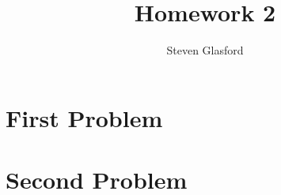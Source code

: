 \documentclass{report}
\title{Homework 2}
\author{Steven Glasford}
\date{\parbox{\linewidth}{\centering%
    \today\endgraf\medskip
    Math-451-M001}}
\begin{document}
\maketitle

\tableofcontents

\part{First Problem}

\part{Second Problem}
\end{document}
